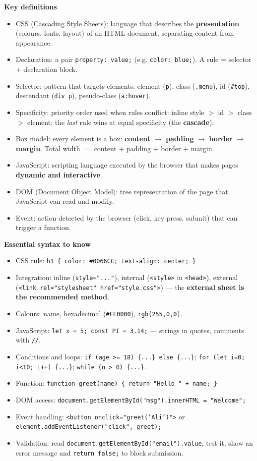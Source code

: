 \documentclass[11pt]{article}
\newcommand{\cle}[1]{{\popxbold\color{popdark}#1}}
\begin{document}
\begin{bilan}
\textbf{Key definitions}
\begin{itemize}
\item \cle{CSS} (Cascading Style Sheets): language that describes the \textbf{presentation} (colours, fonts, layout) of an HTML document, separating content from appearance.
\item \cle{Declaration}: a pair \texttt{property: value;} (e.g. \texttt{color: blue;}). A \cle{rule} = selector + declaration block.
\item \cle{Selector}: pattern that targets elements: element (\texttt{p}), class (\texttt{.menu}), id (\texttt{\#top}), descendant (\texttt{div p}), pseudo-class (\texttt{a:hover}).
\item \cle{Specificity}: priority order used when rules conflict: inline style $>$ id $>$ class $>$ element; the \emph{last} rule wins at equal specificity (the \textbf{cascade}).
\item \cle{Box model}: every element is a box: \textbf{content} $\rightarrow$ \textbf{padding} $\rightarrow$ \textbf{border} $\rightarrow$ \textbf{margin}. Total width $=$ content $+$ padding $+$ border $+$ margin.
\item \cle{JavaScript}: scripting language executed by the browser that makes pages \textbf{dynamic and interactive}.
\item \cle{DOM} (Document Object Model): tree representation of the page that JavaScript can read and modify.
\item \cle{Event}: action detected by the browser (click, key press, submit) that can trigger a function.
\end{itemize}

\textbf{Essential syntax to know}
\begin{itemize}
\item CSS rule: \texttt{h1 \{ color: \#0066CC; text-align: center; \}}
\item Integration: inline (\texttt{style="..."}), internal (\texttt{<style>} in \texttt{<head>}), external (\texttt{<link rel="stylesheet" href="style.css">}) --- the \textbf{external sheet is the recommended method}.
\item Colours: name, hexadecimal (\texttt{\#FF0000}), \texttt{rgb(255,0,0)}.
\item JavaScript: \texttt{let x = 5; const PI = 3.14;} --- strings in quotes, comments with \texttt{//}.
\item Conditions and loops: \texttt{if (age >= 18) \{...\} else \{...\}}; \texttt{for (let i=0; i<10; i++) \{...\}}; \texttt{while (n > 0) \{...\}}.
\item Function: \texttt{function greet(name) \{ return "Hello " + name; \}}
\item DOM access: \texttt{document.getElementById("msg").innerHTML = "Welcome";}
\item Event handling: \texttt{<button onclick="greet('Ali')">} or \texttt{element.addEventListener("click", greet);}
\item Validation: read \texttt{document.getElementById("email").value}, test it, show an error message and \texttt{return false;} to block submission.
\end{itemize}


\end{bilan}
\end{document}
